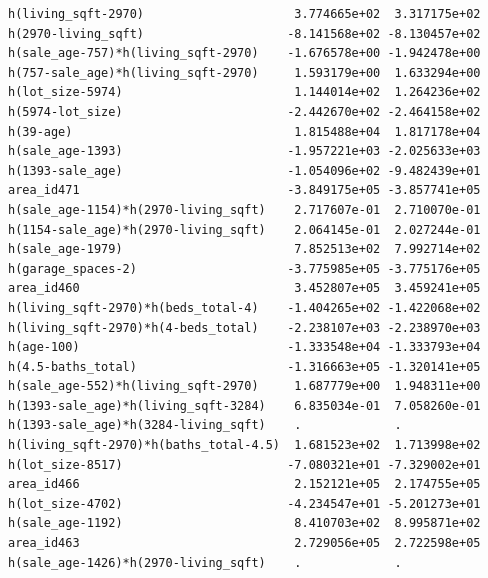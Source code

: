\documentclass[
]{article}
\begin{document}
\begin{verbatim}
h(living_sqft-2970)                     3.774665e+02  3.317175e+02
h(2970-living_sqft)                    -8.141568e+02 -8.130457e+02
h(sale_age-757)*h(living_sqft-2970)    -1.676578e+00 -1.942478e+00
h(757-sale_age)*h(living_sqft-2970)     1.593179e+00  1.633294e+00
h(lot_size-5974)                        1.144014e+02  1.264236e+02
h(5974-lot_size)                       -2.442670e+02 -2.464158e+02
h(39-age)                               1.815488e+04  1.817178e+04
h(sale_age-1393)                       -1.957221e+03 -2.025633e+03
h(1393-sale_age)                       -1.054096e+02 -9.482439e+01
area_id471                             -3.849175e+05 -3.857741e+05
h(sale_age-1154)*h(2970-living_sqft)    2.717607e-01  2.710070e-01
h(1154-sale_age)*h(2970-living_sqft)    2.064145e-01  2.027244e-01
h(sale_age-1979)                        7.852513e+02  7.992714e+02
h(garage_spaces-2)                     -3.775985e+05 -3.775176e+05
area_id460                              3.452807e+05  3.459241e+05
h(living_sqft-2970)*h(beds_total-4)    -1.404265e+02 -1.422068e+02
h(living_sqft-2970)*h(4-beds_total)    -2.238107e+03 -2.238970e+03
h(age-100)                             -1.333548e+04 -1.333793e+04
h(4.5-baths_total)                     -1.316663e+05 -1.320141e+05
h(sale_age-552)*h(living_sqft-2970)     1.687779e+00  1.948311e+00
h(1393-sale_age)*h(living_sqft-3284)    6.835034e-01  7.058260e-01
h(1393-sale_age)*h(3284-living_sqft)    .             .           
h(living_sqft-2970)*h(baths_total-4.5)  1.681523e+02  1.713998e+02
h(lot_size-8517)                       -7.080321e+01 -7.329002e+01
area_id466                              2.152121e+05  2.174755e+05
h(lot_size-4702)                       -4.234547e+01 -5.201273e+01
h(sale_age-1192)                        8.410703e+02  8.995871e+02
area_id463                              2.729056e+05  2.722598e+05
h(sale_age-1426)*h(2970-living_sqft)    .             .           
                                                                  

\end{verbatim}
\end{document}
